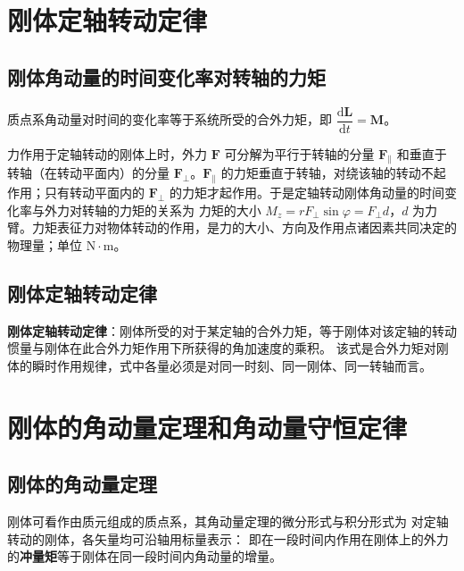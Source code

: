 \section{刚体定轴转动定律}
    \subsection{刚体角动量的时间变化率\texorpdfstring{\hspace{0.5em}}{ }对转轴的力矩}
    质点系角动量对时间的变化率等于系统所受的合外力矩，即 $\dfrac{\mathrm{d}\boldsymbol{L}}{\mathrm{d}t}=\boldsymbol{M}$。

    力作用于定轴转动的刚体上时，外力 $\boldsymbol{F}$ 可分解为平行于转轴的分量 $\boldsymbol{F}_{\parallel}$ 和垂直于转轴（在转动平面内）的分量 $\boldsymbol{F}_{\perp}$。$\boldsymbol{F}_{\parallel}$ 的力矩垂直于转轴，对绕该轴的转动不起作用；只有转动平面内的 $\boldsymbol{F}_{\perp}$ 的力矩才起作用。于是定轴转动刚体角动量的时间变化率与外力对转轴的力矩的关系为
    力矩的大小 $M_{z}=rF_{\perp}\sin\varphi=F_{\perp}d$，$d$ 为力臂。力矩表征力对物体转动的作用，是力的大小、方向及作用点诸因素共同决定的物理量；单位 $\mathrm{N\cdot m}$。

    \subsection{刚体定轴转动定律}
    \textbf{刚体定轴转动定律}：刚体所受的对于某定轴的合外力矩，等于刚体对该定轴的转动惯量与刚体在此合外力矩作用下所获得的角加速度的乘积。
    该式是合外力矩对刚体的瞬时作用规律，式中各量必须是对同一时刻、同一刚体、同一转轴而言。

\section{刚体的角动量定理和角动量守恒定律}
    \subsection{刚体的角动量定理}
    刚体可看作由质元组成的质点系，其角动量定理的微分形式与积分形式为
    对定轴转动的刚体，各矢量均可沿轴用标量表示：
    即在一段时间内作用在刚体上的外力的\textbf{冲量矩}等于刚体在同一段时间内角动量的增量。

